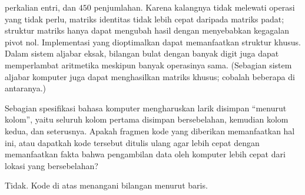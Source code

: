 \begin{exercises}
\begin{answer}
      perkalian entri, dan $450$ penjumlahan. Karena kalangnya tidak melewati
      operasi yang tidak perlu, matriks identitas tidak lebih cepat daripada
      matriks padat; struktur matriks hanya dapat mengubah hasil dengan
      menyebabkan kegagalan pivot nol.
      Implementasi yang dioptimalkan dapat memanfaatkan struktur khusus.
      Dalam sistem aljabar eksak, bilangan bulat dengan banyak digit juga dapat
      memperlambat aritmetika meskipun banyak operasinya sama.
      (Sebagian sistem aljabar komputer juga dapat menghasilkan matriks khusus;
      cobalah beberapa di antaranya.)
    \end{answer}
  \item Sebagian spesifikasi bahasa komputer mengharuskan larik disimpan
    ``menurut kolom'', yaitu seluruh kolom pertama disimpan bersebelahan,
    kemudian kolom kedua, dan seterusnya.
    Apakah fragmen kode yang diberikan memanfaatkan hal ini, atau dapatkah kode
    tersebut ditulis ulang agar lebih cepat dengan memanfaatkan fakta bahwa
    pengambilan data oleh komputer lebih cepat dari lokasi yang bersebelahan?
    \begin{answer}
      Tidak. Kode di atas menangani bilangan menurut baris.
    \end{answer}
\end{exercises}
\endinput
